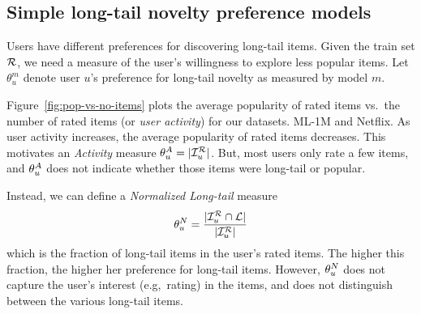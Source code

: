 \subsection{Simple long-tail novelty preference models}
\label{sec:simple-lt-pref}
Users have different preferences for discovering long-tail items.  Given the train set $\mathcal{R}$, we need  a measure of the user's willingness to explore less popular items.  Let  $\theta_u^m$ denote user $u$'s preference for long-tail novelty as measured by  model $m$.

Figure~\ref{fig:pop-vs-no-items} plots the average popularity of rated items vs.~the number of rated items (or \emph{user activity})  for 
\iffullpaper
our datasets. 
\else
ML-1M and Netflix. 
\fi
 As user activity increases, the average popularity of rated items decreases. This motivates an \textit{Activity} measure $\theta_u^{A} = \vert \mathcal{I}_{u}^{\mathcal{R}} \vert$. But,  most users  only rate  a few items, and $\theta_u^{A}$ does not indicate whether those items were long-tail  or popular.  %


Instead, we can define a \textit{Normalized Long-tail} measure
\begin{align}
\small\theta_u^{N} = \frac{  \vert \mathcal{I}_{u}^{\mathcal{R}}  \cap \mathcal{L} \vert}{\vert \mathcal{I}_{u}^{\mathcal{R}} \vert}
\label{eq:nlt-risk}
\end{align} 
which is the fraction of long-tail items in the user's  rated items.  The higher this fraction, the higher her  preference for long-tail items. However, $\theta_u^{N}$ does not capture the user's interest (e.g,~rating) in the items, and does not distinguish between the various long-tail items.

